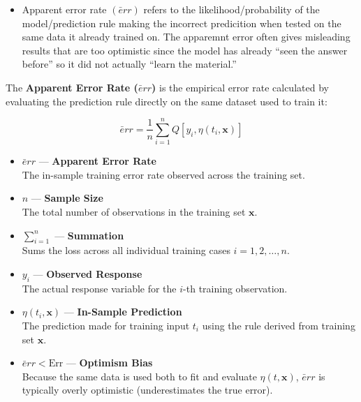 \documentclass[
  letterpaper,
  DIV=11,
  numbers=noendperiod]{scrreprt}
\providecommand{\tightlist}{%
  \setlength{\itemsep}{0pt}\setlength{\parskip}{0pt}}
\begin{document}
\begin{itemize}
\tightlist
\item
  Apparent error rate \((\bar{e}rr)\) refers to the
  likelihood/probability of the model/prediction rule making the
  incorrect predicition when tested on the same data it already trained
  on. The apparemnt error often gives misleading results that are too
  optimistic since the model has already ``seen the answer before'' so
  it did not actually ``learn the material.''
\end{itemize}

\begin{tcolorbox}[enhanced jigsaw, arc=.35mm, bottomrule=.15mm, bottomtitle=1mm, breakable, colback=white, colbacktitle=quarto-callout-note-color!10!white, colframe=quarto-callout-note-color-frame, coltitle=black, left=2mm, leftrule=.75mm, opacityback=0, opacitybacktitle=0.6, rightrule=.15mm, title=\textcolor{quarto-callout-note-color}{\faInfo}\hspace{0.5em}{Definition: Apparent Error Rate}, titlerule=0mm, toprule=.15mm, toptitle=1mm]

The \textbf{Apparent Error Rate (\(\bar{e}rr\))} is the empirical error
rate calculated by evaluating the prediction rule directly on the same
dataset used to train it:

\[
\bar{e}rr = \frac{1}{n} \sum_{i=1}^{n} Q[y_i, \eta(t_i, \mathbf{x})]
\]

\begin{itemize}
\item
  \textbf{\(\bar{e}rr\)} --- \textbf{Apparent Error Rate}\\
  The in-sample training error rate observed across the training set.
\item
  \textbf{\(n\)} --- \textbf{Sample Size}\\
  The total number of observations in the training set \(\mathbf{x}\).
\item
  \textbf{\(\sum_{i=1}^{n}\)} --- \textbf{Summation}\\
  Sums the loss across all individual training cases
  \(i = 1, 2, \dots, n\).
\item
  \textbf{\(y_i\)} --- \textbf{Observed Response}\\
  The actual response variable for the \(i\)-th training observation.
\item
  \textbf{\(\eta(t_i, \mathbf{x})\)} --- \textbf{In-Sample Prediction}\\
  The prediction made for training input \(t_i\) using the rule derived
  from training set \(\mathbf{x}\).
\item
  \textbf{\(\bar{e}rr < \text{Err}\)} --- \textbf{Optimism Bias}\\
  Because the same data is used both to fit and evaluate
  \(\eta(t, \mathbf{x})\), \(\bar{e}rr\) is typically overly optimistic
  (underestimates the true error).
\end{itemize}

\end{tcolorbox}
\end{document}
